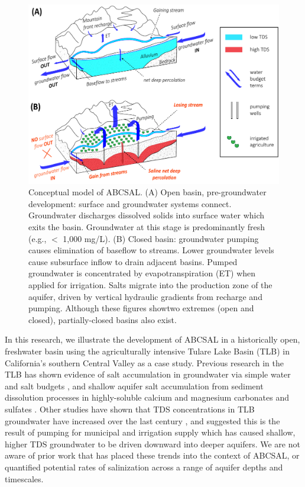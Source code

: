 \begin{figure}[H]
	\includegraphics[width=\textwidth]{ch3_figs/mm_conceptual_model_gw_sal_2_stages.pdf}
	\caption{Conceptual model of ABCSAL. (A) Open basin, pre-groundwater development: surface and groundwater systems connect. Groundwater discharges dissolved solids into surface water which exits the basin. Groundwater at this stage is predominantly fresh (e.g., $<$ 1,000 mg/L). (B) Closed basin: groundwater pumping causes elimination of baseflow to streams. Lower groundwater levels cause subsurface inflow to drain adjacent basins. Pumped groundwater is concentrated by evapotranspiration (ET) when applied for irrigation. Salts migrate into the production zone of the aquifer, driven by vertical hydraulic gradients from recharge and pumping. Although these figures showtwo extremes (open and closed), partially-closed basins also exist.}
	\label{fig:conceptual_model_gw_sal}
\end{figure}

In this research, we illustrate the development of ABCSAL in a historically open, freshwater basin using the agriculturally intensive Tulare Lake Basin (TLB) in California's southern Central Valley as a case study. Previous research in the TLB has shown evidence of salt accumulation in groundwater via simple water and salt budgets \citep{Kenneth1975}, and shallow aquifer salt accumulation from sediment dissolution processes in highly-soluble calcium and magnesium carbonates and sulfates \citep{Schoups2005}. Other studies have shown that TDS concentrations in TLB groundwater have increased over the last century \citep{Hansen2018, Lindsey2018}, and suggested this is the result of pumping for municipal and irrigation supply which has caused shallow, higher TDS groundwater to be driven downward into deeper aquifers. We are not aware of prior work that has placed these trends into the context of ABCSAL, or quantified potential rates of salinization across a range of aquifer depths and timescales. 

